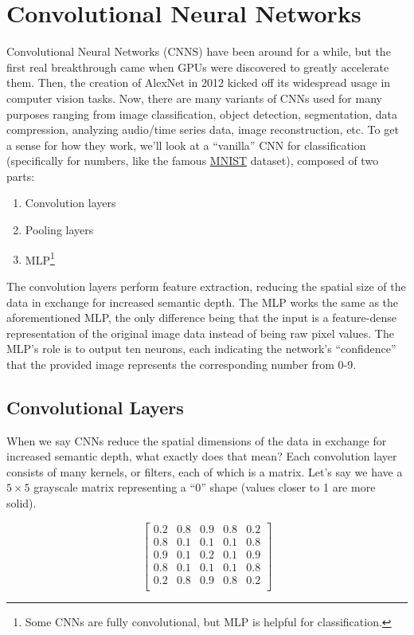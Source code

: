 \documentclass[12pt]{article}
\begin{document}
\newpage
\section{Convolutional Neural Networks}

Convolutional Neural Networks (CNNS) have been around for a while, but the first real breakthrough came when GPUs were discovered to greatly accelerate them. Then, the creation of AlexNet in 2012 kicked off its widespread usage in computer vision tasks. Now, there are many variants of CNNs used for many purposes ranging from image classification, object detection, segmentation, data compression, analyzing audio/time series data, image reconstruction, etc. To get a sense for how they work, we'll look at a \enquote{vanilla} CNN for classification (specifically for numbers, like the famous \href{https://en.wikipedia.org/wiki/MNIST_database}{MNIST} dataset), composed of two parts:

\begin{enumerate}
  \item Convolution layers
  \item Pooling layers
  \item MLP\footnote{Some CNNs are fully convolutional, but MLP is helpful for classification. }
\end{enumerate}

The convolution layers perform feature extraction, reducing the spatial size of the data in exchange for increased semantic depth. The MLP works the same as the aforementioned MLP, the only difference being that the input is a feature-dense representation of the original image data instead of being raw pixel values. The MLP's role is to output ten neurons, each indicating the network's \enquote{confidence} that the provided image represents the corresponding number from 0-9. 

\subsection{Convolutional Layers}
When we say CNNs reduce the spatial dimensions of the data in exchange for increased semantic depth, what exactly does that mean? Each convolution layer consists of many kernels, or filters, each of which is a matrix. Let's say we have a $5 \times 5$ grayscale matrix representing a \enquote{0} shape (values closer to 1 are more solid).  

\[
\begin{bmatrix}
0.2 & 0.8 & 0.9 & 0.8 & 0.2 \\
0.8 & 0.1 & 0.1 & 0.1 & 0.8 \\
0.9 & 0.1 & 0.2 & 0.1 & 0.9 \\
0.8 & 0.1 & 0.1 & 0.1 & 0.8 \\
0.2 & 0.8 & 0.9 & 0.8 & 0.2 \\
\end{bmatrix}
\]
\end{document}
